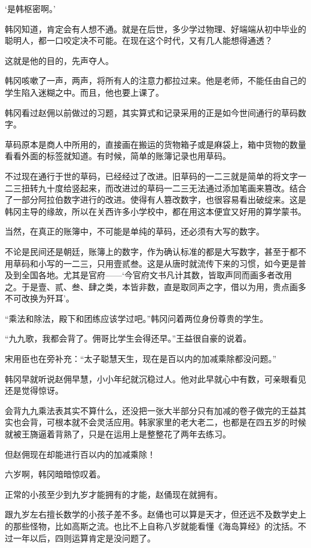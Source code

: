 ‘是韩枢密啊。’

韩冈知道，肯定会有人想不通。就是在后世，多少学过物理、好端端从初中毕业的聪明人，都一口咬定决不可能。在现在这个时代，又有几人能想得通透？

这就是他的目的，先声夺人。

韩冈咳嗽了一声，两声，将所有人的注意力都拉过来。他是老师，不能任由自己的学生陷入迷糊之中。而且，他也要上课了。

韩冈看过赵佣以前做过的习题，其实算式和记录采用的正是如今世间通行的草码数字。

草码原本是商人中所用的，直接画在搬运的货物箱子或是麻袋上，箱中货物的数量看看外面的标签就知道。有时候，简单的账簿记录也用草码。

不过现在通行于世的草码，已经经过了改进。旧草码的一二三就是简单的将文字一二三扭转九十度给竖起来，而改进过的草码一二三无法通过添加笔画来篡改。结合了一部分阿拉伯数字进行的改进。使得有人篡改数字，也很容易看出破绽来。这是韩冈主导的缘故，所以在关西许多小学校中，都在用这本便宜又好用的算学蒙书。

当然，在真正的账簿中，不可能是单纯的草码，还必须有大写的数字。

不论是民间还是朝廷，账簿上的数字，作为确认标准的都是大写数字，甚至于都不用草码和小写的一二三，只用壹贰叁。这是从唐时就流传下来的习惯，如今更是普及到全国各地。尤其是官府——‘今官府文书凡计其数，皆取声同而画多者改用之。于是壹、贰、叁、肆之类，本皆非数，直是取同声之字，借以为用，贵点画多不可改换为歼耳’。

“乘法和除法，殿下和团练应该学过吧。”韩冈问着两位身份尊贵的学生。

“九九歌，我都会背了。佣哥比学生会得还早。”王益很自豪的说着。

宋用臣也在旁补充：“太子聪慧天生，现在是百以内的加减乘除都没问题。”

韩冈早就听说赵佣早慧，小小年纪就沉稳过人。他对此早就心中有数，可亲眼看见还是觉得惊讶。

会背九九乘法表其实不算什么，还没把一张大半部分只有加减的卷子做完的王益其实也会背，可根本就不会灵活应用。韩家家里的老大老二，也都是在四五岁的时候就被王旖逼着背熟了，只是在运用上是整整花了两年去练习。

但赵佣现在却能进行百以内的加减乘除！

六岁啊，韩冈暗暗惊叹着。

正常的小孩至少到九岁才能拥有的才能，赵俑现在就拥有。

跟九岁左右擅长数学的小孩子差不多。赵俑也可以算是天才，但还远不及数学史上的那些怪物，比如高斯之流。也比不上自称八岁就能看懂《海岛算经》的沈括。不过一年以后，四则运算肯定是没问题了。

